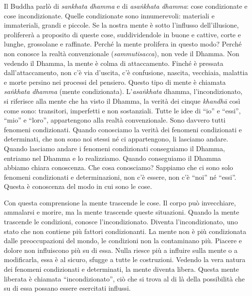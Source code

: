 Il Buddha parlò di \emph{sankhata dhamma} e di \emph{asaṅkhata dhamma}:
cose condizionate e cose incondizionate. Quelle condizionate sono
innumerevoli: materiali e immateriali, grandi e piccole. Se la nostra
mente è sotto l'influsso dell'illusione, prolifererà a proposito di
queste cose, suddividendole in buone e cattive, corte e lunghe,
grossolane e raffinate. Perché la mente prolifera in questo modo? Perché
non conosce la realtà convenzionale (\emph{sammutisacca}), non vede il
Dhamma. Non vedendo il Dhamma, la mente è colma di attaccamento. Finché
è pressata dall'attaccamento, non c'è via d'uscita, c'è confusione,
nascita, vecchiaia, malattia e morte persino nei processi del pensiero.
Questo tipo di mente è chiamata \emph{saṅkhata dhamma} (mente
condizionata). L'\emph{asaṅkhata} dhamma, l'incondizionato, si
riferisce alla mente che ha visto il Dhamma, la verità dei cinque
\emph{khandhā} così come sono: transitori, imperfetti e non sostanziali.
Tutte le idee di ``io'' e ``essi'', ``mio'' e ``loro'', appartengono
alla realtà convenzionale. Sono davvero tutti fenomeni condizionati.
Quando conosciamo la verità dei fenomeni condizionati e determinati, che
non sono noi stessi né ci appartengono, li lasciamo andare. Quando
lasciamo andare i fenomeni condizionati conseguiamo il Dhamma, entriamo
nel Dhamma e lo realizziamo. Quando conseguiamo il Dhamma abbiamo chiara
conoscenza. Che cosa conosciamo? Sappiamo che ci sono solo fenomeni
condizionati e determinazioni, non c'è essere, non c'è ``noi'' né
``essi''. Questa è conoscenza del modo in cui sono le cose.

Con questa comprensione la mente trascende le cose. Il corpo può
invecchiare, ammalarsi e morire, ma la mente trascende queste
situazioni. Quando la mente trascende le condizioni, conosce
l'incondizionato. Diventa l'incondizionato, uno stato che non contiene
più fattori condizionanti. La mente non è più condizionata dalle
preoccupazioni del mondo, le condizioni non la contaminano più. Piacere
e dolore non influiscono più su di essa. Nulla riesce più a influire
sulla mente o a modificarla, essa è al sicuro, sfugge a tutte le
costruzioni. Vedendo la vera natura dei fenomeni condizionati e
determinati, la mente diventa libera. Questa mente liberata è chiamata
``incondizionato'', ciò che si trova al di là della possibilità che su
di essa possano essere esercitati influssi.

